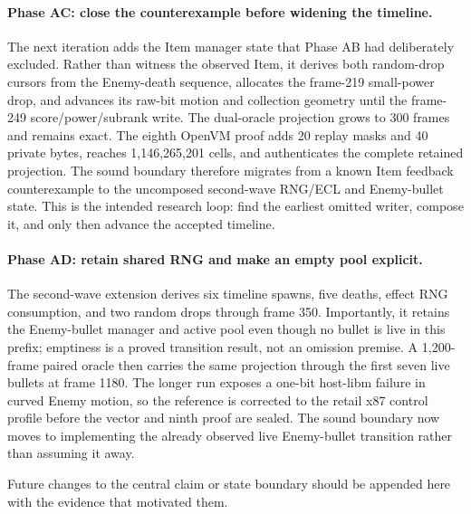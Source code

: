 \paragraph{Phase AC: close the counterexample before widening the timeline.}
The next iteration adds the Item manager state that Phase AB had deliberately
excluded.  Rather than witness the observed Item, it derives both random-drop
cursors from the Enemy-death sequence, allocates the frame-219 small-power
drop, and advances its raw-bit motion and collection geometry until the
frame-249 score/power/subrank write.  The dual-oracle projection grows to 300
frames and remains exact.  The eighth OpenVM proof adds 20 replay masks and 40
private bytes, reaches 1,146,265,201 cells, and authenticates the complete
retained projection.  The sound boundary therefore migrates from a known Item
feedback counterexample to the uncomposed second-wave RNG/ECL and Enemy-bullet
state.  This is the intended research loop: find the earliest omitted writer,
compose it, and only then advance the accepted timeline.

\paragraph{Phase AD: retain shared RNG and make an empty pool explicit.}
The second-wave extension derives six timeline spawns, five deaths, effect RNG
consumption, and two random drops through frame 350.  Importantly, it retains
the Enemy-bullet manager and active pool even though no bullet is live in this
prefix; emptiness is a proved transition result, not an omission premise.  A
1,200-frame paired oracle then carries the same projection through the first
seven live bullets at frame 1180.  The longer run exposes a one-bit host-libm
failure in curved Enemy motion, so the reference is corrected to the retail
x87  control profile before the vector and ninth proof are
sealed.  The sound boundary now moves to implementing the already observed
live Enemy-bullet transition rather than assuming it away.

Future changes to the central claim or state boundary should be appended here
with the evidence that motivated them.
